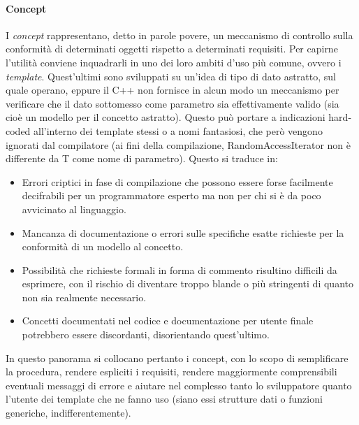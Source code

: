 \paragraph{Concept} I \textit{concept} rappresentano, detto in parole povere, un meccanismo di controllo sulla conformità di determinati oggetti rispetto a determinati requisiti. Per capirne l'utilità conviene inquadrarli in uno dei loro ambiti d'uso più comune, ovvero i \textit{template}. Quest'ultimi sono sviluppati su un'idea di tipo di dato astratto, sul quale operano, eppure il C++ non fornisce in alcun modo un meccanismo per verificare che il dato sottomesso come parametro sia effettivamente valido (sia cioè un modello per il concetto astratto). Questo può portare a indicazioni hard-coded all'interno dei template stessi o a nomi fantasiosi, che però vengono ignorati dal compilatore (ai fini della compilazione, RandomAccessIterator non è differente da T come nome di parametro). Questo si traduce in:
\begin{itemize}
 \item Errori criptici in fase di compilazione che possono essere forse facilmente decifrabili per un programmatore esperto ma non per chi si è da poco avvicinato al linguaggio.
 \item Mancanza di documentazione o errori sulle specifiche esatte richieste per la conformità di un modello al concetto.
 \item Possibilità che richieste formali in forma di commento risultino difficili da esprimere, con il rischio di diventare troppo blande o più stringenti di quanto non sia realmente necessario.
 \item Concetti documentati nel codice e documentazione per utente finale potrebbero essere discordanti, disorientando quest'ultimo.
\end{itemize}
In questo panorama si collocano pertanto i concept, con lo scopo di semplificare la procedura, rendere espliciti i requisiti, rendere maggiormente comprensibili eventuali messaggi di errore e aiutare nel complesso tanto lo sviluppatore quanto l'utente dei template che ne fanno uso (siano essi strutture dati o funzioni generiche, indifferentemente).

